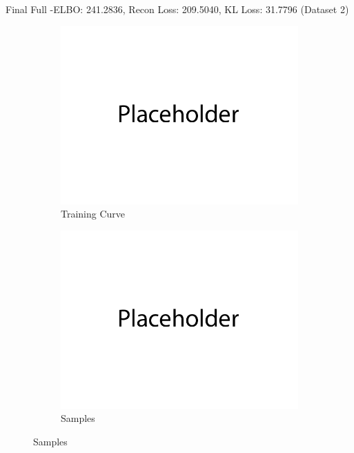 \documentclass{article}
\begin{document}
\begin{enumerate}[(a)]
     Final Full -ELBO: 241.2836, Recon Loss: 209.5040, KL Loss: 31.7796 (Dataset 2)
     \begin{figure}[H]
            \centering
            \begin{subfigure}[b]{0.475\textwidth}
                \centering
                \includegraphics[width=\textwidth]{figures/q2_a_dset2_train_plot.png}
                \caption{Training Curve}
            \end{subfigure}
            \hfill
            \begin{subfigure}[b]{0.475\textwidth}
                \centering
                \includegraphics[width=\textwidth]{figures/q2_a_dset2_samples.png}
                \caption{Samples}
            \end{subfigure}

\end{figure}
\end{enumerate}
\end{document}
